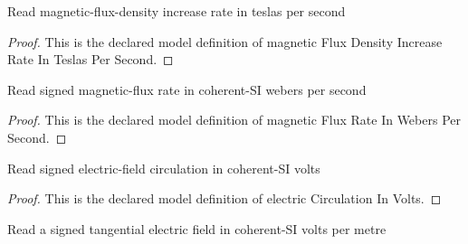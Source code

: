 \begin{definition}
  \label{def:physics:phyx-mini-0938:phyxminiproblems-problemphyxmini0938-magneticfluxdensityincreaserateinteslaspersecond}
  Read magnetic-flux-density increase rate in teslas per second
\end{definition}
\begin{proof}
  This is the declared model definition of magnetic Flux Density Increase Rate In Teslas Per Second.
\end{proof}
\begin{definition}
  \label{def:physics:phyx-mini-0938:phyxminiproblems-problemphyxmini0938-magneticfluxrateinweberspersecond}
  Read signed magnetic-flux rate in coherent-SI webers per second
\end{definition}
\begin{proof}
  This is the declared model definition of magnetic Flux Rate In Webers Per Second.
\end{proof}
\begin{definition}
  \label{def:physics:phyx-mini-0938:phyxminiproblems-problemphyxmini0938-electriccirculationinvolts}
  Read signed electric-field circulation in coherent-SI volts
\end{definition}
\begin{proof}
  This is the declared model definition of electric Circulation In Volts.
\end{proof}
\begin{definition}
  \label{def:physics:phyx-mini-0938:phyxminiproblems-problemphyxmini0938-signedelectricfieldinvoltspermeter}
  Read a signed tangential electric field in coherent-SI volts per metre
\end{definition}
